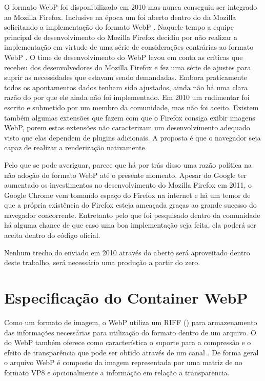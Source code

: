 \documentclass[espaco=simples,appendix=Name]{abnt}
\begin{document}
O formato WebP foi disponibilizado em 2010 mas nunca conseguiu ser integrado ao Mozilla Firefox. Inclusive na época um  foi aberto dentro do  da Mozilla solicitando a implementação do formato WebP \cite{FirefoxBug}. Naquele tempo a equipe principal de desenvolvimento do Mozilla Firefox decidiu por não realizar a implementação em virtude de uma série de considerações contrárias ao formato WebP \cite{WebPCritica}. O time de desenvolvimento do WebP levou em conta as críticas que recebeu dos desenvolvedores do Mozilla Firefox e fez uma série de ajustes para suprir as necessidades que estavam sendo demandadas. Embora praticamente todos os apontamentos dados tenham sido ajustados, ainda não há uma clara razão do por que ele ainda não foi implementado. Em 2010 um  rudimentar foi escrito e submetido por um membro da comunidade, mas não foi aceito. Existem também algumas extensões que fazem com que o Firefox consiga exibir imagens WebP, porem estas extensões não caracterizam um desenvolvimento adequado visto que elas dependem de plugins adicionais. A proposta é que o navegador seja capaz de realizar a renderização nativamente.

Pelo que se pode averiguar, parece que há por trás disso uma razão política na não adoção do formato WebP até o presente momento. Apesar do Google ter aumentado os investimentos no desenvolvimento do Mozilla Firefox em 2011, o Google Chrome vem tomando espaço do Firefox na internet e há um temor de que a própria existência do Firefox esteja ameaçada graças ao grande sucesso do navegador concorrente. Entretanto pelo que foi pesquisado dentro da comunidade há alguma chance de que caso uma boa implementação seja feita, ela poderá ser aceita dentro do código oficial.

Nenhum trecho do  enviado em 2010 através do  aberto será aproveitado dentro deste trabalho, será necessário uma produção a partir do zero.

\section{Especificação do Container WebP}

Como um formato de imagem, o WebP utiliza um  RIFF () para armazenamento das informações necessárias para utilização do formato dentro de um arquivo. O  do WebP também oferece como característica o suporte para a compressão  e o efeito de transparência que pode ser obtido através de um canal . De forma geral o arquivo WebP é composto da imagem representada por uma matriz de  no formato VP8 e opcionalmente a informação em relação a transparência.
\end{document}
